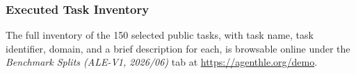\subsubsection{Executed Task Inventory}
\label{app:complete-executed-task-inventory}

The full inventory of the 150 selected public tasks, with task name, task identifier, domain, and a brief description for each, is browsable online under the \emph{Benchmark Splits (ALE-V1, 2026/06)} tab at \url{https://agenthle.org/demo}. 
